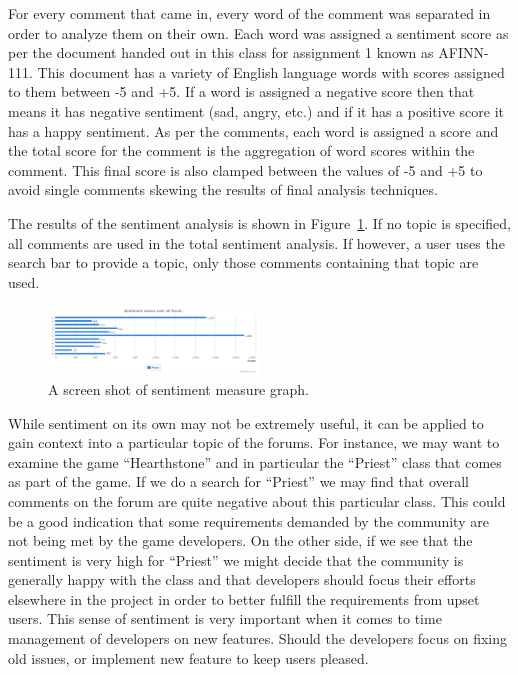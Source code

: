 \documentclass[conference]{IEEEtran}
\begin{document}
For every comment that came in, every word of the comment was separated in order to analyze them on their own.
Each word was assigned a sentiment score as per the document handed out in this class for assignment 1
known as AFINN-111. This document has a variety of English language words with scores assigned to them
between -5 and +5. If a word is assigned a negative score then that means it has negative sentiment (sad, 
angry, etc.) and if it has a positive score it has a happy sentiment. As per the comments, each word is assigned
a score and the total score for the comment is the aggregation of word scores within the comment. This final
score is also clamped between the values of -5 and +5 to avoid single comments skewing the results of
final analysis techniques. 

The results of the sentiment analysis is shown in Figure~\ref{fig:sent}. If no topic is specified, all comments
are used in the total sentiment analysis. If however, a user uses the search bar to provide a topic, only those
comments containing that topic are used.

\begin{figure}[h]
\centering
\includegraphics[width=0.5\textwidth]{images/sent.png}
\caption{A screen shot of sentiment measure graph.\label{fig:sent}}
\end{figure}

While sentiment on its own may not be extremely useful, it can be applied to gain context into a particular
topic of the forums. For instance, we may want to examine the game ``Hearthstone'' and in particular the
``Priest'' class that comes as part of the game. If we do a search for ``Priest'' we may find that overall
comments on the forum are quite negative about this particular class. This could be a good indication that
some requirements demanded by the community are not being met by the game developers. On the other side,
if we see that the sentiment is very high for ``Priest'' we might decide that the community is generally 
happy with the class and that developers should focus their efforts elsewhere in the project in order to
better fulfill the requirements from upset users. This sense of sentiment is very important when it comes
to time management of developers on new features. Should the developers focus on fixing old issues, or 
implement new feature to keep users pleased.
\end{document}
